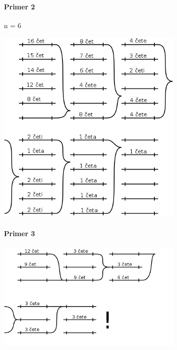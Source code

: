 \documentclass[a4paper,10pt]{article}
\begin{document}
\paragraph{Primer 2}
n = 6
	\begin{center}
	\includegraphics[width=9.1cm,height=9.65cm]{Slike/PolifaznoZlivanjePrimer2.png}
	\end{center}

\paragraph{Primer 3}
	\begin{center}
	\includegraphics[width=9.1cm,height=5.3cm]{Slike/PolifaznoZlivanjePrimer3.png}
	\end{center}
\end{document}
